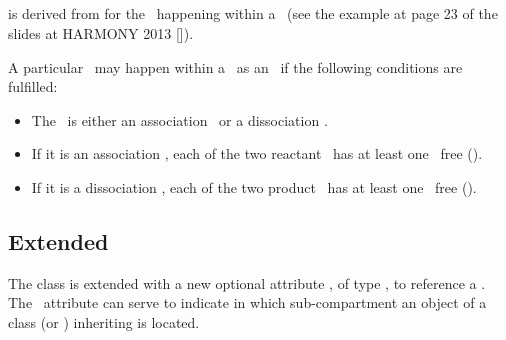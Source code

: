 \subsection{}
\label{def:IntraSpeciesReaction}

 is derived from  for the \reactions\ happening within a \species\ (see the example  at page 23  of the slides at HARMONY 2013 [\cite{ref:harmony2013}]).

A particular \reaction\ may happen within a \species\ as an \intraSpeciesReaction\ if the following conditions are fulfilled:
\begin{itemize}
 \item The \reaction\ is either an association \reaction\ or a dissociation \reaction.
 \item If it is an association \reaction, each of the two reactant \species\ has at least one \outwardBindingSite\ free ().
 \item If it is a dissociation \reaction, each of the two product \species\ has at least one \outwardBindingSite\ free ().
\end{itemize}

\label{Note:IntraSpeciesReaction}


\subsection{Extended }
\label{def:ExSimpleSpeciesReference}

The \SimpleSpeciesReference class is extended with a new optional attribute \compartmentReferenceAtt, of type \SIdRefPT, to reference a \compartmentReference.  The \compartmentReferenceAtt\ attribute can serve to indicate in which sub-compartment an object of a class (\SpeciesReference or
\ModifierSpeciesReference) inheriting \ExSimpleSpeciesReference is located.


